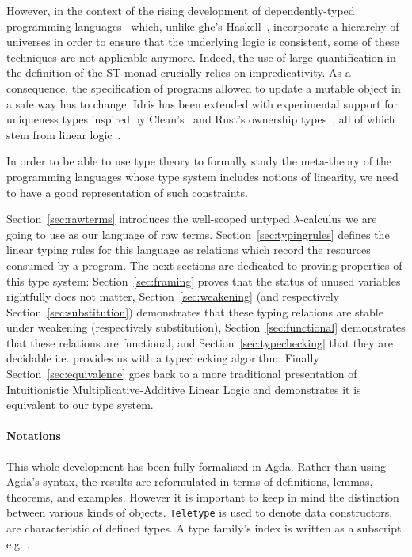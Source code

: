 However, in the context of the rising development of dependently-typed
programming languages~\cite{Brady2013idris, norell2009dependently} which,
unlike ghc's Haskell~\cite{weirich2013towards}, incorporate a hierarchy
of universes in order to ensure that the underlying logic is consistent,
some of these techniques are not applicable anymore. Indeed, the use of
large quantification in the definition of the ST-monad crucially relies
on impredicativity. As a consequence, the specification of programs
allowed to update a mutable object in a safe way has to change.
Idris has been extended with experimental support for uniqueness types
inspired by Clean's~\cite{achten1993high} and Rust's ownership types~\cite{manual:rust},
all of which stem from linear logic~\cite{girard1987linear}.

In order to be able to use type theory to formally study the meta-theory
of the programming languages whose type system includes notions of linearity,
we need to have a good representation of such constraints.

Section~\ref{sec:rawterms} introduces the well-scoped untyped \ensuremath{\lambda}-calculus
we are going to use as our language of raw terms. Section~\ref{sec:typingrules}
defines the linear typing rules for this language as relations which
record the resources consumed by a program. The next sections are dedicated
to proving properties of this type system: Section~\ref{sec:framing}
proves that the status of unused variables rightfully does not matter,
Section~\ref{sec:weakening} (and respectively Section~\ref{sec:substitution})
demonstrates that these typing relations are stable under weakening
(respectively substitution), Section~\ref{sec:functional} demonstrates that
these relations are functional, and Section~\ref{sec:typechecking} that
they are decidable i.e. provides us with a typechecking algorithm. Finally
Section~\ref{sec:equivalence} goes back to a more traditional presentation
of Intuitionistic Multiplicative-Additive Linear Logic and demonstrates it is
equivalent to our type system.


\paragraph*{Notations} This whole development has been fully formalised
in Agda. Rather than using Agda's syntax, the results are reformulated
in terms of definitions, lemmas, theorems, and examples. However it is
important to keep in mind the distinction between various kinds of objects.
\texttt{Teletype} is used to denote data constructors,  are characteristic of defined types. A type family's index is
written as a subscript e.g. .

